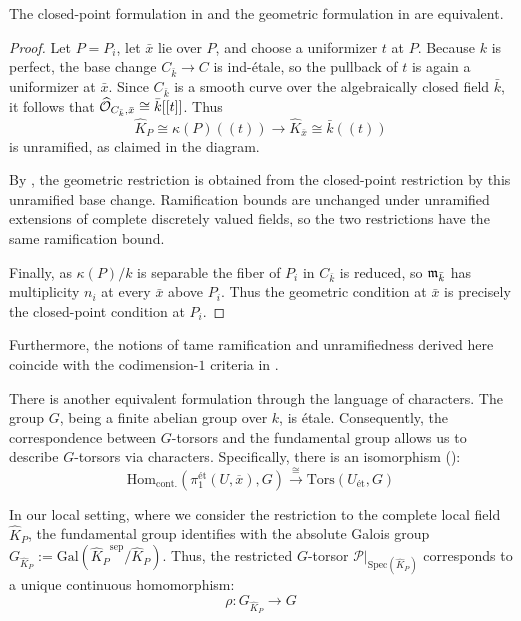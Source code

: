 \begin{prop}\label{prop:equivalence_ramification_bounded_by_modulus}
The closed-point formulation in
 and the geometric formulation in
 are equivalent.
\end{prop}

\begin{proof}
Let $P=P_i$, let $\bar{x}$ lie over $P$, and choose a uniformizer $t$ at $P$.
Because $k$ is perfect, the base change $C_{\bar{k}}\to C$ is ind-\'etale, so the pullback of $t$
is again a uniformizer at $\bar{x}$. Since $C_{\bar{k}}$ is a smooth curve over the algebraically
closed field $\bar{k}$, it follows that
$\widehat{\mathcal{O}}_{C_{\bar{k}},\bar{x}}\cong\bar{k}[[t]]$. Thus
\[
    \widehat{K}_P\cong\kappa(P)((t))
    \longrightarrow
    \widehat{K}_{\bar{x}}\cong\bar{k}((t))
\]
is unramified, as claimed in the diagram.

By , the geometric restriction is obtained from the
closed-point restriction by this unramified base change. Ramification bounds are unchanged under
unramified extensions of complete discretely valued fields, so the two restrictions have the same
ramification bound.

Finally, as $\kappa(P)/k$ is separable the fiber of $P_i$ in $C_{\bar{k}}$ is reduced, so
$\mathfrak{m}_{\bar{k}}$ has multiplicity $n_i$ at every $\bar{x}$ above $P_i$. Thus the geometric
condition at $\bar{x}$ is precisely the closed-point condition at $P_i$.
\end{proof}

Furthermore,
the notions of tame ramification and unramifiedness derived here coincide with the codimension-$1$
criteria in .

There is another equivalent formulation through the language of characters.
The group $G$, being a finite abelian group over $k$, is \'etale.
Consequently, the correspondence between $G$-torsors and the fundamental group allows us to describe $G$-torsors
 via characters. Specifically, there is an isomorphism ():
\[ \mathrm{Hom}_{\mathrm{cont.}}(\pi_1^{\text{\'et}}(U, \overline{x}), G) \xrightarrow{\cong} \mathrm{Tors}(U_{\text{\'et}}, G) \]

In our local setting, where we consider the restriction to the complete local field $\widehat{K}_P$,
the fundamental group identifies with the absolute Galois group
$G_{\widehat{K}_P} := \mathrm{Gal}({\widehat{K}_P}^{\mathrm{sep}}/{\widehat{K}_P})$.
Thus, the restricted $G$-torsor $\mathcal{P}|_{\mathrm{Spec}(\widehat{K}_P)}$ corresponds to a unique continuous homomorphism:
\[ \rho : G_{\widehat{K}_P} \to G \]

